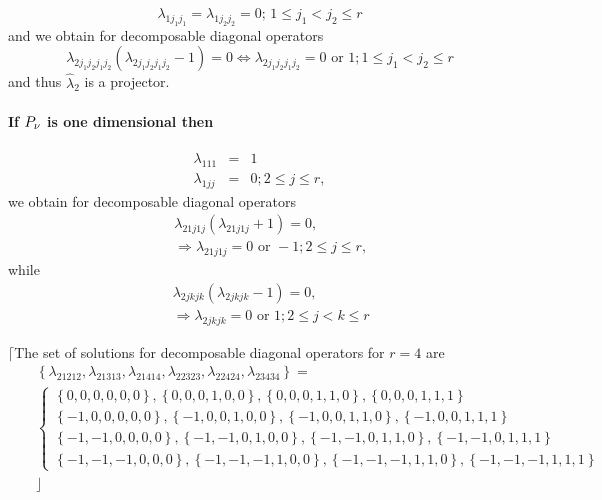 \documentclass[12pt]{article}
\begin{document}
\begin{equation*}
\lambda _{1j_{1}j_{1}}=\lambda _{1j_{2}j_{2}}=0;\,1\leq j_{1}<j_{2}\leq r
\end{equation*}%
and we obtain for decomposable diagonal operators 
\begin{equation*}
\lambda _{2j_{1}j_{2}j_{1}j_{2}}\left( \lambda
_{2j_{1}j_{2}j_{1}j_{2}}-1\right) =0\Leftrightarrow \lambda
_{2j_{1}j_{2}j_{1}j_{2}}=0\text{ or }1;1\leq j_{1}<j_{2}\leq r
\end{equation*}%
and thus $\hat{\lambda}_{2}$ is a projector.

\paragraph{ If $P_{\mathcal{\protect\nu }}$ is one dimensional then}

\begin{eqnarray*}
\lambda _{111} &=&1 \\
\lambda _{1jj} &=&0;2\leq j\leq r,
\end{eqnarray*}%
we obtain for decomposable diagonal operators 
\begin{eqnarray*}
&&\lambda _{21j1j}\left( \lambda _{21j1j}+1\right) =0,\, \\
&&\left. \Rightarrow \right. \lambda _{21j1j}=0\text{ or }-1;2\leq j\leq r,
\end{eqnarray*}%
while 
\begin{eqnarray*}
&&\lambda _{2jkjk}\left( \lambda _{2jkjk}-1\right) =0,\, \\
&&\left. \Rightarrow \right. \lambda _{2jkjk}=0\text{ or }1;2\leq j<k\leq r
\end{eqnarray*}

$\lceil $The set of solutions for decomposable diagonal operators for $r=4$
are 
\begin{eqnarray*}
&&\left\{ \lambda _{21212},\lambda _{21313},\lambda _{21414},\lambda
_{22323},\lambda _{22424},\lambda _{23434}\right\} = \\
&&\left\{ 
\begin{array}{c}
\left\{ 0,0,0,0,0,0\right\} ,\left\{ 0,0,0,1,0,0\right\} ,\left\{
0,0,0,1,1,0\right\} ,\left\{ 0,0,0,1,1,1\right\} \\ 
\left\{ -1,0,0,0,0,0\right\} ,\left\{ -1,0,0,1,0,0\right\} ,\left\{
-1,0,0,1,1,0\right\} ,\left\{ -1,0,0,1,1,1\right\} \\ 
\left\{ -1,-1,0,0,0,0\right\} ,\left\{ -1,-1,0,1,0,0\right\} ,\left\{
-1,-1,0,1,1,0\right\} ,\left\{ -1,-1,0,1,1,1\right\} \\ 
\left\{ -1,-1,-1,0,0,0\right\} ,\left\{ -1,-1,-1,1,0,0\right\} ,\left\{
-1,-1,-1,1,1,0\right\} ,\left\{ -1,-1,-1,1,1,1\right\}%
\end{array}%
\right. \\
&&\rfloor
\end{eqnarray*}
\end{document}
